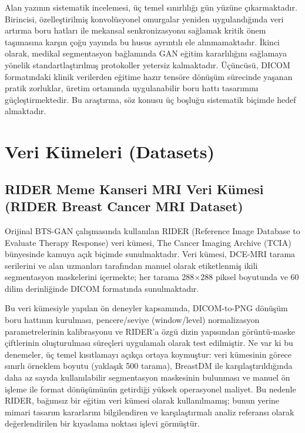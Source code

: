 \documentclass[10pt,journal,compsoc]{IEEEtran}
\begin{document}
Alan yazının sistematik incelemesi, üç temel sınırlılığı gün yüzüne çıkarmaktadır. Birincisi, özelleştirilmiş konvolüsyonel omurgalar yeniden uygulandığında veri artırma boru hatları ile mekansal senkronizasyonu sağlamak kritik önem taşımasına karşın çoğu yayında bu husus ayrıntılı ele alınmamaktadır. İkinci olarak, medikal segmentasyon bağlamında GAN eğitim kararlılığını sağlamaya yönelik standartlaştırılmış protokoller yetersiz kalmaktadır. Üçüncüsü, DICOM formatındaki klinik verilerden eğitime hazır tensöre dönüşüm sürecinde yaşanan pratik zorluklar, üretim ortamında uygulanabilir boru hattı tasarımını güçleştirmektedir. Bu araştırma, söz konusu üç boşluğu sistematik biçimde hedef almaktadır.

\section{Veri Kümeleri \textnormal{\small{(Datasets)}}}

\subsection{RIDER Meme Kanseri MRI Veri Kümesi \textnormal{\small{(RIDER Breast Cancer MRI Dataset)}}}

Orijinal BTS-GAN çalışmasında \cite{haq2022bts} kullanılan RIDER (Reference Image Database to Evaluate Therapy Response) veri kümesi, The Cancer Imaging Archive (TCIA) bünyesinde kamuya açık biçimde sunulmaktadır. Veri kümesi, DCE-MRI tarama serilerini ve alan uzmanları tarafından manuel olarak etiketlenmiş ikili segmentasyon maskelerini içermekte; her tarama 288$\times$288 piksel boyutunda ve 60 dilim derinliğinde DICOM formatında sunulmaktadır.

Bu veri kümesiyle yapılan ön deneyler kapsamında, DICOM-to-PNG dönüşüm boru hattının kurulması, pencere/seviye (window/level) normalizasyon parametrelerinin kalibrasyonu ve RIDER'a özgü dizin yapısından görüntü-maske çiftlerinin oluşturulması süreçleri uygulamalı olarak test edilmiştir. Ne var ki bu denemeler, üç temel kısıtlamayı açıkça ortaya koymuştur: veri kümesinin görece sınırlı örneklem boyutu (yaklaşık 500 tarama), BreastDM ile karşılaştırıldığında daha az sayıda kullanılabilir segmentasyon maskesinin bulunması ve manuel ön işleme ile format dönüşümünün getirdiği yüksek operasyonel maliyet. Bu nedenle RIDER, bağımsız bir eğitim veri kümesi olarak kullanılmamış; bunun yerine mimari tasarım kararlarını bilgilendiren ve karşılaştırmalı analiz referansı olarak değerlendirilen bir kıyaslama noktası işlevi görmüştür.
\end{document}
